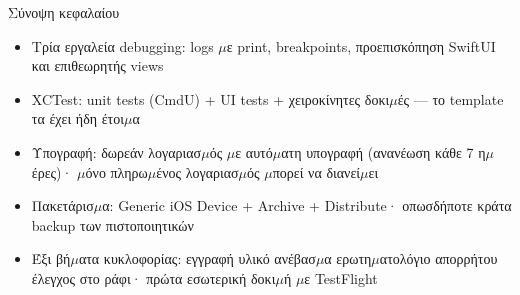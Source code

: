 \begin{tcbsummary}{Σύνοψη κεφαλαίου}
\begin{itemize}
  \item Τρία εργαλεία debugging: logs $\mu$ε print, breakpoints, προεπισκόπηση SwiftUI και επιθεωρητής views
  \item XCTest: unit tests (CmdU) + UI tests + χειροκίνητες δοκι$\mu$ές — το template τα έχει ήδη έτοι$\mu$α
  \item Υπογραφή: δωρεάν λογαριασ$\mu$ός $\mu$ε αυτό$\mu$ατη υπογραφή (ανανέωση κάθε 7 η$\mu$έρες)· $\mu$όνο πληρω$\mu$ένος λογαριασ$\mu$ός $\mu$πορεί να διανεί$\mu$ει
  \item Πακετάρισ$\mu$α: Generic iOS Device + Archive + Distribute· οπωσδήποτε κράτα backup των πιστοποιητικών
  \item Έξι βή$\mu$ατα κυκλοφορίας: εγγραφή υλικό ανέβασ$\mu$α ερωτη$\mu$ατολόγιο απορρήτου έλεγχος στο ράφι· πρώτα εσωτερική δοκι$\mu$ή $\mu$ε TestFlight
\end{itemize}

\end{tcbsummary}
